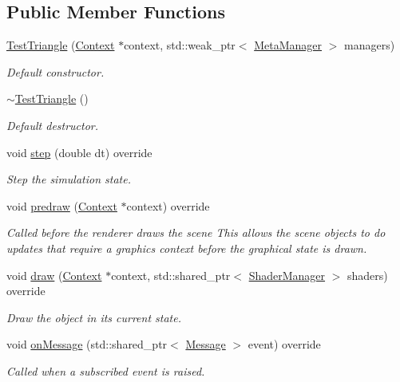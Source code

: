 \subsection*{Public Member Functions}
\begin{DoxyCompactItemize}
\item 
\hyperlink{class_test_triangle_ab15daddb4dae8e8ae52aea99afb7d440}{Test\+Triangle} (\hyperlink{class_context}{Context} $\ast$context, std\+::weak\+\_\+ptr$<$ \hyperlink{class_meta_manager}{Meta\+Manager} $>$ managers)
\begin{DoxyCompactList}\small\item\em Default constructor. \end{DoxyCompactList}\item 
\hyperlink{class_test_triangle_aa58d78d1dfb839f32b62881341865ddb}{$\sim$\+Test\+Triangle} ()
\begin{DoxyCompactList}\small\item\em Default destructor. \end{DoxyCompactList}\item 
void \hyperlink{class_test_triangle_a99c4fb3e4da6d1dabf3f9cdeef5b1b31}{step} (double dt) override
\begin{DoxyCompactList}\small\item\em Step the simulation state. \end{DoxyCompactList}\item 
void \hyperlink{class_test_triangle_a0b7b66d114a3d97e524f2d8d9f13a9e7}{predraw} (\hyperlink{class_context}{Context} $\ast$context) override
\begin{DoxyCompactList}\small\item\em Called before the renderer draws the scene This allows the scene objects to do updates that require a graphics context before the graphical state is drawn. \end{DoxyCompactList}\item 
void \hyperlink{class_test_triangle_aadf5ec7f41246e3c114e7f44f009f303}{draw} (\hyperlink{class_context}{Context} $\ast$context, std\+::shared\+\_\+ptr$<$ \hyperlink{class_shader_manager}{Shader\+Manager} $>$ shaders) override
\begin{DoxyCompactList}\small\item\em Draw the object in its current state. \end{DoxyCompactList}\item 
void \hyperlink{class_test_triangle_ac5165e9e0ecdc4b232752b49c1ecbec0}{on\+Message} (std\+::shared\+\_\+ptr$<$ \hyperlink{class_message}{Message} $>$ event) override
\begin{DoxyCompactList}\small\item\em Called when a subscribed event is raised. \end{DoxyCompactList}\end{DoxyCompactItemize}
